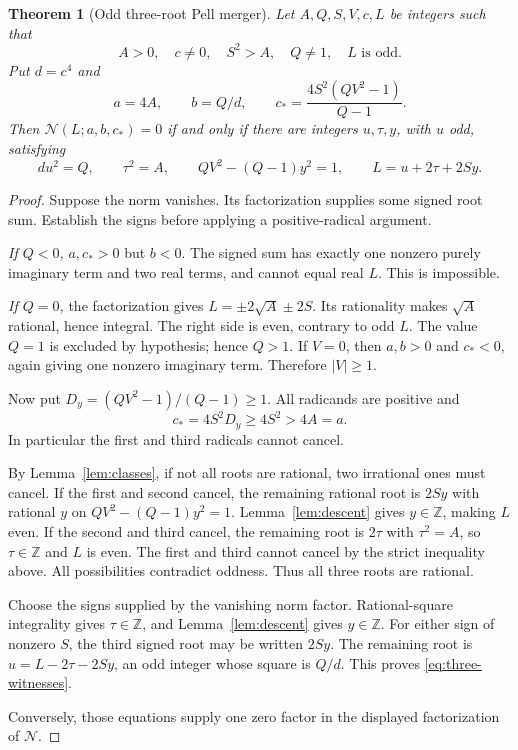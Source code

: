 \documentclass[11pt,letterpaper]{article}
\newtheorem{theorem}{Theorem}[section]
\theoremstyle{remark}\newtheorem{remark}[theorem]{Remark}
\newcommand{\Z}{\mathbb Z}\newcommand{\N}{\mathbb N}\newcommand{\Q}{\mathbb Q}
\begin{document}
\begin{theorem}[Odd three-root Pell merger]\label{thm:three}
Let $A,Q,S,V,c,L$ be integers such that
\[
 A>0,\quad c\ne0,\quad S^2>A,\quad Q\ne1,\quad L\text{ is odd}.
\]
Put $d=c^4$ and
\[
 a=4A,\qquad b=Q/d,\qquad c_*=\frac{4S^2(QV^2-1)}{Q-1}.
\]
Then $\mathscr N(L;a,b,c_*)=0$ if and only if there are integers
$u,\tau,y$, with $u$ odd, satisfying
\begin{equation}\label{eq:three-witnesses}
 du^2=Q,\qquad \tau^2=A,\qquad
 QV^2-(Q-1)y^2=1,\qquad L=u+2\tau+2Sy.
\end{equation}
\end{theorem}
\begin{proof}
Suppose the norm vanishes. Its factorization supplies some signed root
sum. Establish the signs before applying a positive-radical argument.

\emph{If $Q<0$,} $a,c_*>0$ but $b<0$. The signed sum has exactly one
nonzero purely imaginary term and two real terms, and cannot equal real $L$.
This is impossible.

\emph{If $Q=0$,} the factorization gives $L=\pm2\sqrt A\pm2S$.
Its rationality makes $\sqrt A$ rational, hence integral. The right side
is even, contrary to odd $L$.
The value $Q=1$ is excluded by hypothesis; hence $Q>1$.
If $V=0$, then $a,b>0$ and $c_*<0$, again giving one nonzero imaginary
term. Therefore $|V|\ge1$.

Now put $D_y=(QV^2-1)/(Q-1)\ge1$. All radicands are positive and
\[
 c_*=4S^2D_y\ge4S^2>4A=a.
\]
In particular the first and third radicals cannot cancel.

By Lemma~\ref{lem:classes}, if not all roots are rational, two irrational
ones must cancel. If the first and second cancel, the remaining rational
root is $2Sy$ with rational $y$ on
$QV^2-(Q-1)y^2=1$. Lemma~\ref{lem:descent} gives $y\in\Z$,
making $L$ even. If the second and third cancel, the remaining root
is $2\tau$ with $\tau^2=A$, so $\tau\in\Z$ and $L$ is even.
The first and third cannot cancel by the strict inequality above.
All possibilities contradict oddness. Thus all three roots are rational.

Choose the signs supplied by the vanishing norm factor. Rational-square
integrality gives $\tau\in\Z$, and Lemma~\ref{lem:descent} gives $y\in\Z$.
For either sign of nonzero $S$, the third signed root may be written
$2Sy$. The remaining root is $u=L-2\tau-2Sy$, an odd integer whose
square is $Q/d$. This proves \eqref{eq:three-witnesses}.

Conversely, those equations supply one zero factor in the displayed
factorization of $\mathscr N$.
\end{proof}
\end{document}
